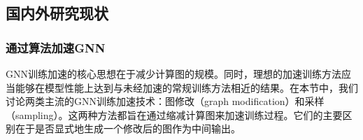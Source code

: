 \subsection{国内外研究现状}

\subsubsection{通过算法加速GNN}
GNN训练加速的核心思想在于减少计算图的规模。同时，理想的加速训练方法应当能够在模型性能上达到与未经加速的常规训练方法相近的结果。在本节中，我们讨论两类主流的GNN训练加速技术：图修改（graph modification）和采样（sampling）。这两种方法都旨在通过缩减计算图来加速训练过程。它们的主要区别在于是否显式地生成一个修改后的图作为中间输出。

